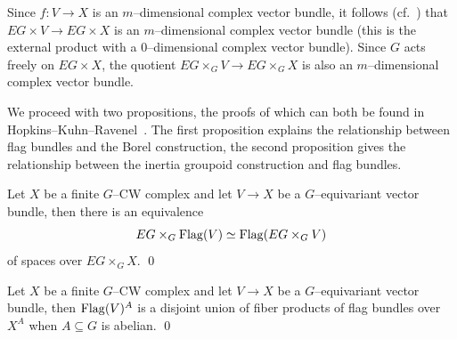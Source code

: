 Since \(f \colon V \rightarrow X\) is an \(m\)--dimensional complex vector bundle, it follows (cf.\ ) that \(EG \times V \rightarrow EG \times X\) is an \(m\)--dimensional complex vector bundle (this is the external product with a \(0\)--dimensional complex vector bundle).
Since \(G\) acts freely on \(EG \times X\), the quotient \(EG \times_G V \rightarrow EG \times_G X\) is also an \(m\)--dimensional complex vector bundle.

We proceed with two propositions, the proofs of which can both be found in Hopkins--Kuhn--Ravenel~\cite[Proposition 2.6]{HKR}.
The first proposition explains the relationship between flag bundles and the Borel construction, the second proposition gives the relationship between the inertia groupoid construction and flag bundles.

\begin{proposition} \label{app:orbitflags}
Let \(X\) be a finite \(G\)--CW complex and let \(V \rightarrow X\) be a \(G\)--equivariant vector bundle, then there is an equivalence
\[
EG \times_G \operatorname{Flag}(V) \simeq \operatorname{Flag}(EG \times_G V)
\]
of spaces over \(EG \times_G X\).
\qed
\end{proposition}

\begin{proposition} \label{app:inertiaflags}
Let \(X\) be a finite \(G\)--CW complex and let \(V \rightarrow X\) be a \(G\)--equivariant vector bundle, then \(\operatorname{Flag}(V)^A\) is a disjoint union of fiber products of flag bundles over \(X^A\) when \(A \subseteq G\) is abelian.
\qed
\end{proposition}

